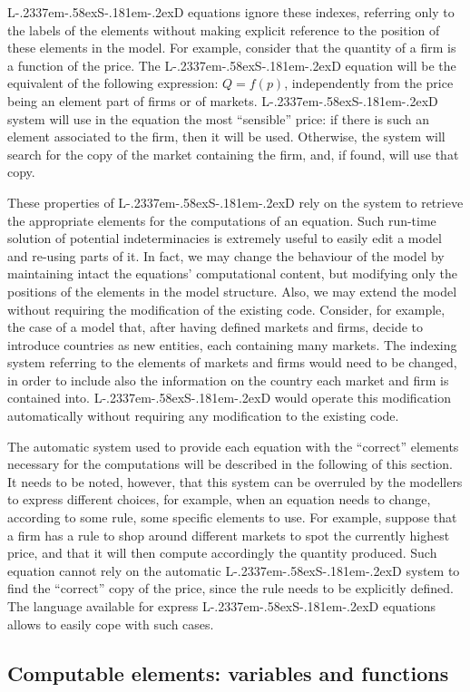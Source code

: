 \documentclass [11pt,a4paper] {book}
\def\LsD{{L\kern-.2337em\lower-.58ex\hbox{S}\kern-.181em\lower-.2ex\hbox{D}}\xspace}
\begin{document}
\LsD equations ignore these indexes, referring only to the labels of the elements without making explicit reference to the position of these elements in the model. For example, consider that the quantity of a firm is a function of the price. The \LsD equation will be the equivalent of the following expression: $Q=f(p)$, independently from the price being an element part of firms or of markets. \LsD system will use in the equation the most ``sensible'' price: if there is such an element associated to the firm, then it will be used. Otherwise, the system will search for the copy of the market containing the firm, and, if found, will use that copy.

These properties of \LsD rely on the system to retrieve the appropriate elements for the computations of an equation. Such run-time solution of potential indeterminacies is extremely useful to easily edit a model and re-using parts of it. In fact, we may change the behaviour of the model by maintaining intact the equations' computational content, but modifying only the positions of the elements in the model structure. Also, we may extend the model without requiring the modification of the existing code. Consider, for example, the case of a model that, after having defined markets and firms, decide to introduce countries as new entities, each containing many markets. The indexing system referring to the elements of markets and firms would need to be changed, in order to include also the information on the country each market and firm is contained into. \LsD would operate this modification automatically without requiring any modification to the existing code.

The automatic system used to provide each equation with the ``correct'' elements necessary for the computations will be described in the following of this section. It needs to be noted, however, that this system can be overruled by the modellers to express different choices, for example, when an equation needs to change, according to some rule, some specific elements to use. For example, suppose that a firm has a rule to shop around different markets to spot the currently highest price, and that it will then compute accordingly the quantity produced. Such equation cannot rely on the automatic \LsD system to find the ``correct'' copy of the price, since the rule needs to be explicitly defined. The language available for express \LsD equations allows to easily cope with such cases.


\subsection{Computable elements: variables and functions}
\end{document}
